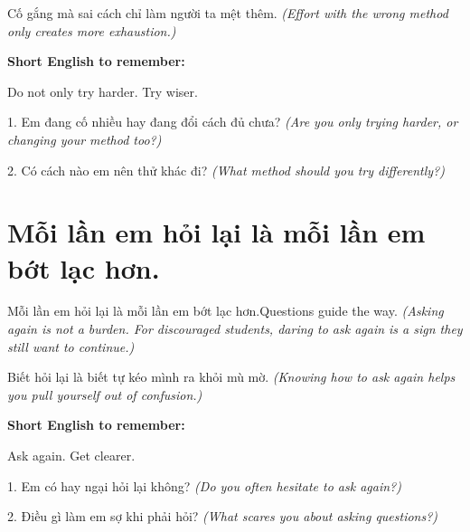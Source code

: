 \begin{baihoc}
Cố gắng mà sai cách chỉ làm người ta mệt thêm.
\textit{(Effort with the wrong method only creates more exhaustion.)}
\end{baihoc}

\begin{ghinhoanh}
\textbf{Short English to remember:}

Do not only try harder. Try wiser.

\end{ghinhoanh}

\begin{tuhocnhanh}
1. Em đang cố nhiều hay đang đổi cách đủ chưa? \textit{(Are you only trying harder, or changing your method too?)}

2. Có cách nào em nên thử khác đi? \textit{(What method should you try differently?)}
\end{tuhocnhanh}
\ngancach


\section{Mỗi lần em hỏi lại là mỗi lần em bớt lạc hơn.}
\begin{truyen}{Mỗi lần em hỏi lại là mỗi lần em bớt lạc hơn.}{Questions guide the way.}
\textit{(Asking again is not a burden. For discouraged students, daring to ask again is a sign they still want to continue.)}
\end{truyen}

\begin{baihoc}
Biết hỏi lại là biết tự kéo mình ra khỏi mù mờ.
\textit{(Knowing how to ask again helps you pull yourself out of confusion.)}
\end{baihoc}

\begin{ghinhoanh}
\textbf{Short English to remember:}

Ask again. Get clearer.

\end{ghinhoanh}

\begin{tuhocnhanh}
1. Em có hay ngại hỏi lại không? \textit{(Do you often hesitate to ask again?)}

2. Điều gì làm em sợ khi phải hỏi? \textit{(What scares you about asking questions?)}
\end{tuhocnhanh}
\ngancach



